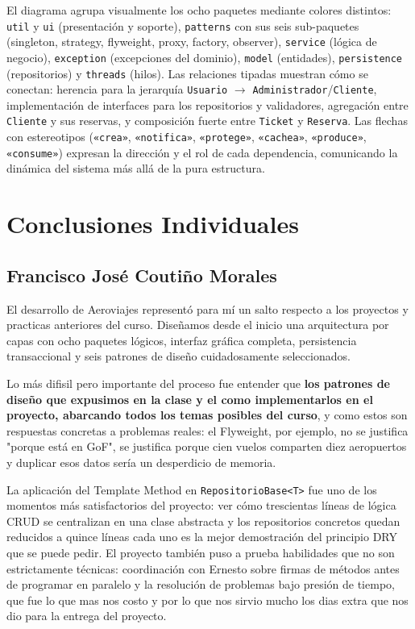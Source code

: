 \documentclass[12pt, letterpaper]{article}
\begin{document}
	El diagrama agrupa visualmente los ocho paquetes mediante colores distintos: \texttt{util} y \texttt{ui} (presentación y soporte), \texttt{patterns} con sus seis sub-paquetes (singleton, strategy, flyweight, proxy, factory, observer), \texttt{service} (lógica de negocio), \texttt{exception} (excepciones del dominio), \texttt{model} (entidades), \texttt{persistence} (repositorios) y \texttt{threads} (hilos). Las relaciones tipadas muestran cómo se conectan: herencia para la jerarquía \texttt{Usuario} $\rightarrow$ \texttt{Administrador}/\texttt{Cliente}, implementación de interfaces para los repositorios y validadores, agregación entre \texttt{Cliente} y sus reservas, y composición fuerte entre \texttt{Ticket} y \texttt{Reserva}. Las flechas con estereotipos (\texttt{«crea»}, \texttt{«notifica»}, \texttt{«protege»}, \texttt{«cachea»}, \texttt{«produce»}, \texttt{«consume»}) expresan la dirección y el rol de cada dependencia, comunicando la dinámica del sistema más allá de la pura estructura.
	
	\section{Conclusiones Individuales}
	
	\subsection{Francisco José Coutiño Morales}
	El desarrollo de Aeroviajes representó para mí un salto  respecto a los proyectos y practicas anteriores del curso. Diseñamos desde el inicio una arquitectura por capas con ocho paquetes lógicos, interfaz gráfica completa, persistencia transaccional y seis patrones de diseño cuidadosamente seleccionados. 
	
	Lo más difisil pero importante del proceso fue entender que \textbf{los patrones de diseño que expusimos en la clase y el como implementarlos en el proyecto, abarcando todos los temas posibles del curso}, y como estos son respuestas concretas a problemas reales: el Flyweight, por ejemplo, no se justifica "porque está en GoF", se justifica porque cien vuelos comparten diez aeropuertos y duplicar esos datos sería un desperdicio de memoria.
	
	La aplicación del Template Method en \texttt{RepositorioBase<T>} fue uno de los momentos más satisfactorios del proyecto: ver cómo trescientas líneas de lógica CRUD se centralizan en una clase abstracta y los repositorios concretos quedan reducidos a quince líneas cada uno es la mejor demostración del principio DRY que se puede pedir. El proyecto también puso a prueba habilidades que no son estrictamente técnicas: coordinación con Ernesto sobre firmas de métodos antes de programar en paralelo y la resolución de problemas bajo presión de tiempo, que fue lo que mas nos costo y por lo que nos sirvio mucho los dias extra que nos dio para la entrega del proyecto.
	
\end{document}
